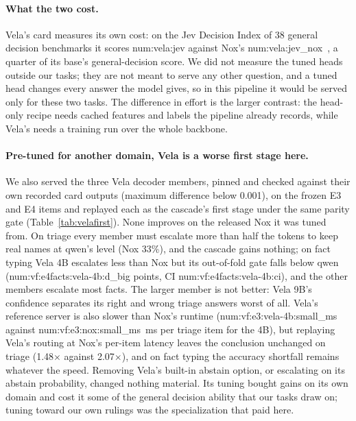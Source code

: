 \documentclass[11pt]{article}
\newcommand{\N}[1]{\csname num:#1\endcsname}
\begin{document}
\paragraph{What the two cost.} Vela's card measures its own cost: on the Jev Decision Index of 38
general decision benchmarks it scores \N{vela:jev} against Nox's \N{vela:jev_nox}~\cite{vela2},
a quarter of its base's general-decision score. We did not measure the tuned heads outside our
tasks; they are not meant to serve any other question, and a tuned head changes every answer the
model gives, so in this pipeline it would be served only for these two tasks. The difference in
effort is the larger contrast: the head-only recipe needs cached features and labels the pipeline
already records, while Vela's needs a training run over the whole backbone.

\paragraph{Pre-tuned for another domain, Vela is a worse first stage here.} We also served the
three Vela decoder members, pinned and checked against their own recorded card outputs
(maximum difference below 0.001), on the frozen E3 and E4 items and replayed each as the cascade's
first stage under the same parity gate (Table~\ref{tab:velafirst}). None improves on the released
Nox it was tuned from. On triage every member must escalate more than half the tokens to keep real
names at qwen's level (Nox 33\%), and the cascade gains nothing; on fact typing Vela 4B escalates
less than Nox but its out-of-fold gate falls below qwen (\N{vf:e4facts:vela-4b:d_big} points, CI
\N{vf:e4facts:vela-4b:ci}), and the other members escalate most facts. The larger member is not
better: Vela 9B's confidence separates its right and wrong triage answers worst of all. Vela's
reference server is also slower than Nox's runtime (\N{vf:e3:vela-4b:small_ms} against
\N{vf:e3:nox:small_ms}~ms per triage item for the 4B), but replaying Vela's routing at Nox's
per-item latency leaves the conclusion unchanged on triage (1.48$\times$ against 2.07$\times$), and
on fact typing the accuracy shortfall remains whatever the speed. Removing Vela's built-in abstain
option, or escalating on its abstain probability, changed nothing material. Its tuning bought gains
on its own domain and cost it some of the general decision ability that our tasks draw on; tuning
toward our own rulings was the specialization that paid here.

\begin{table}[t]
\centering
\small
\setlength{\tabcolsep}{4pt}
\resizebox{\textwidth}{!}{}
\caption{Vela 2.0 members as the cascade's first stage on our tasks, replay only (same parity gate,
2-fold by group, and qwen service times as Table~\ref{tab:replay}). ``Alone'': the first stage's own
accuracy. ms/item: the first stage's measured single-stream service time (Vela via its reference
server, Nox via its runtime). Tuned Nox rows repeated from Table~\ref{tab:replay} for comparison.
Vela served as released (abstain option on); removing it moved no figure by more than 0.4 points.}
\label{tab:velafirst}
\end{table}
\end{document}
